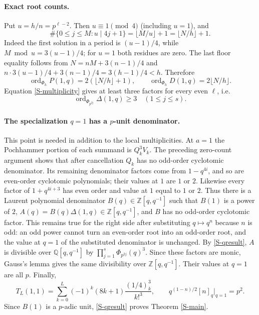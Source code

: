 \documentclass[11pt,letterpaper]{article}
\numberwithin{equation}{section}
\newcommand{\vp}{\operatorname{ord}}
\begin{document}
\paragraph{Exact root counts.}
Put $u=h/n=p^{\ell-2}$. Then $u\equiv1\pmod4$ (including $u=1$),
and
\[
 \#\{0\le j\le M:u\mid4j+1\}
 =\lfloor M/u\rfloor+1=\lfloor N/h\rfloor+1.
\]
Indeed the first solution in a period is $(u-1)/4$, while
$M\bmod u=3(u-1)/4$; for $u=1$ both residues are zero.
The last floor equality follows from
$N=nM+3(n-1)/4$ and
$n\cdot3(u-1)/4+3(n-1)/4=3(h-1)/4<h$.
Therefore
\[
 \vp_{\Phi_h}P(1,q)=2(\lfloor N/h\rfloor+1),\qquad
 \vp_{\Phi_h}D(1,q)=2\lfloor N/h\rfloor.
\]
Equation \eqref{S-multiplicity} gives at least three factors for every
even $\ell$, i.e.
\begin{equation}\label{S-qresult}
 \vp_{\Phi_{p^{2j}}}\Delta(1,q)\ge3\quad(1\le j\le s).
\end{equation}

\paragraph{The specialization $q=1$ has a $p$-unit denominator.}
This point is needed in addition to the local multiplicities.
At $a=1$ the Pochhammer portion of each summand is
$Q_k^3V_k$. The preceding zero-count argument shows that after
cancellation $Q_k$ has no odd-order cyclotomic denominator.
Its remaining denominator factors come from $1-q^{4i}$, and so are
even-order cyclotomic polynomials; their values at $1$ are $1$ or $2$.
Likewise every factor of $1+q^{4i+3}$ has even order and value at $1$
equal to $1$ or $2$. Thus there is a Laurent polynomial denominator
$B(q)\in\mathbb Z[q,q^{-1}]$ such that $B(1)$ is a power of $2$,
$A(q)=B(q)\Delta(1,q)\in\mathbb Z[q,q^{-1}]$, and $B$ has no
odd-order cyclotomic factor. This remains true for the right side
after substituting $q\mapsto q^n$ because $n$ is odd: an odd power
cannot turn an even-order root into an odd-order root, and the value
at $q=1$ of the substituted denominator is unchanged.
By \eqref{S-qresult}, $A$ is divisible over $\mathbb Q[q,q^{-1}]$ by
$\prod_{j=1}^s\Phi_{p^{2j}}(q)^3$. Since these factors are monic,
Gauss's lemma gives the same divisibility over
$\mathbb Z[q,q^{-1}]$. Their values at $q=1$ are all $p$.
Finally,
\[
 T_L(1,1)=\sum_{k=0}^L(-1)^k(8k+1)\frac{(1/4)_k^3}{k!^3},
 \qquad q^{(1-n)/2}[n]_q\big|_{q=1}=p^2.
\]
Since $B(1)$ is a $p$-adic unit, \eqref{S-qresult} proves
Theorem \ref{S-main}.

\clearpage\endgroup
\end{document}
